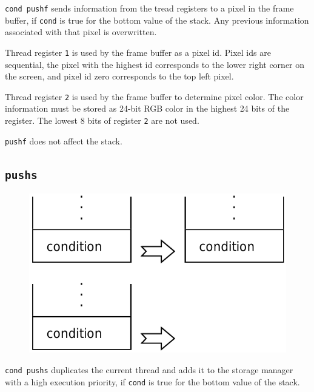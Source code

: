 			\texttt{cond pushf} sends information from the tread registers to a
			pixel in the frame buffer, if \texttt{cond} is true for the bottom
			value of the stack. Any previous information associated with that
			pixel is overwritten.
			
			Thread register \texttt{1} is used by the frame buffer as a pixel
			id. Pixel ids are sequential, the pixel with the highest id
			corresponds to the lower right corner on the screen, and pixel id
			zero corresponds to the top left pixel.

			Thread register \texttt{2} is used by the frame buffer to determine
			pixel color. The color information must be stored as 24-bit RGB 
			color in the highest 24 bits of the register. The lowest 8 bits of
			register \texttt{2} are not used.
			
			\texttt{pushf} does not affect the stack.
	
	\qquad

	\subsection*{\texttt{pushs}}
	
		\begin{figure}
			\begin{flushright}
				\includegraphics[width=\linewidth]{figure/pdf/i_push} 
			\end{flushright}
			\vspace{80pt}
		\end{figure}
	
			\texttt{cond pushs} duplicates the current thread and adds it to
			the storage manager with a high execution priority, if
			\texttt{cond} is true for the bottom value of the stack.

